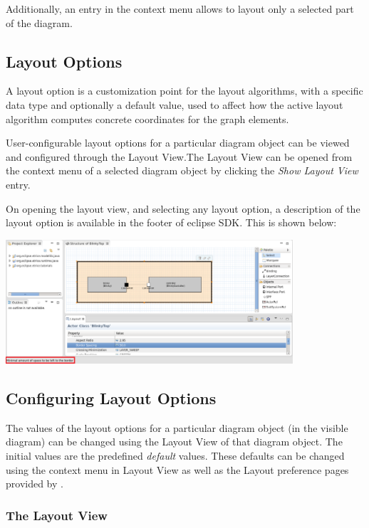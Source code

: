 Additionally, an entry in the context menu allows to layout only a selected part of the diagram.

\subsection{\label{layoutOptions}Layout Options}

A layout option is a customization point for the layout algorithms, with a specific data type and 
optionally a default value, used to affect how the active layout algorithm computes concrete coordinates 
for the graph elements.

User-configurable layout options for a particular diagram object can be viewed and configured through the 
Layout View.The Layout View can be opened from the context menu of a selected diagram object by clicking 
the \textit{Show Layout View} entry. 

On opening the layout view, and selecting any layout option, a description of the layout option is 
available in the footer of eclipse SDK. This is shown below:

\includegraphics[width=0.8\textwidth]{images/043-LayoutOptionDescription.png}

\subsection{\label{configureOptions}Configuring Layout Options}

The values of the layout options for a particular diagram object (in the visible diagram) can be changed 
using the Layout View of that diagram object. The initial values are the predefined \emph{default} values. 
These defaults can be changed using the context menu in Layout View as well as the Layout preference pages 
provided by \eTrice{}.

\subsubsection{\label{layoutView}The Layout View}

